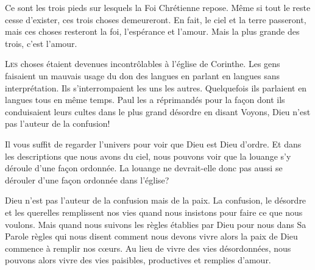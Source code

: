 Ce sont les trois pieds sur lesquels la Foi Chrétienne repose. 
 Même si tout le reste cesse d'exister, ces trois choses demeureront.
 En fait, le ciel et la terre passeront, mais ces choses resteront\frcolon{}
 la foi, l'espérance et l'amour.
 Mais la plus grande des trois, c'est l'amour.

\dvrule







\lettrine{L}{es} choses étaient devenues incontrôlables
 à l'église de Corinthe.
 Les gens faisaient un mauvais usage du don des langues
 en parlant en langues sans interprétation.
 Ils s'interrompaient les uns les autres.
 Quelquefois ils parlaient en langues tous en même temps.
 Paul les a réprimandés pour la fa\c{c}on dont ils conduisaient
 leurs cultes dans le plus grand désordre en disant\frcolon{} 
 \Og Voyons, Dieu n'est pas l'auteur de la confusion! \Fg{}

Il vous suffit de regarder l'univers
 pour voir que Dieu est Dieu d'ordre.
 Et dans les descriptions que nous avons du ciel,
 nous pouvons voir que la louange s'y déroule d'une fa\c{c}on ordonnée.
 La louange ne devrait-elle donc pas aussi se dérouler
 d'une fa\c{c}on ordonnée dans l'église?


Dieu n'est pas l'auteur de la confusion mais de la paix.
 La confusion, le désordre et les querelles remplissent nos vies
 quand nous insistons pour faire ce que nous voulons.
 Mais quand nous suivons les règles établies par Dieu pour nous dans Sa Parole
 \ocadr règles qui nous disent comment nous devons vivre \fcadr{}
 alors la paix de Dieu commence à remplir nos c\oe{}urs.
 Au lieu de vivre des vies désordonnées,
 nous pouvons alors vivre des vies paisibles,
 productives et remplies d'amour.

